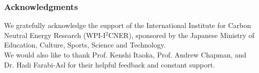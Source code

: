 \begin{frame}
  \frametitle{Acknowledgments}
       We gratefully acknowledge the support of the International Institute for Carbon
Neutral Energy Research (WPI-I$^2$CNER), sponsored by the Japanese Ministry of Education,
Culture, Sports, Science and Technology.\\
	We would also like to thank Prof. Kenshi Itaoka, Prof. Andrew Chapman, and Dr. Hadi Farabi-Asl for their helpful feedback and constant support.
\end{frame}
